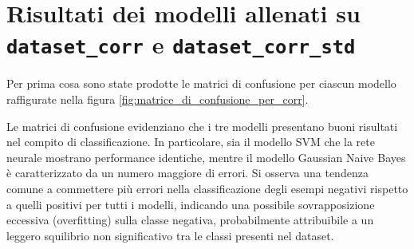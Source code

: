 \section{Risultati dei modelli allenati su \texttt{dataset\_corr} e
  \texttt{dataset\_corr\_std}} \label{sec:risultati_corr}
Per prima cosa sono state prodotte le matrici di confusione per ciascun modello
raffigurate nella figura \ref{fig:matrice_di_confusione_per_corr}.

Le matrici di confusione evidenziano che i tre modelli presentano buoni risultati
nel compito di classificazione. In particolare, sia il modello SVM che la rete
neurale mostrano performance identiche, mentre il modello Gaussian Naive Bayes è
caratterizzato da un numero maggiore di errori. Si osserva una tendenza comune a
commettere più errori nella classificazione degli esempi negativi rispetto a
quelli positivi per tutti i modelli, indicando una possibile sovrapposizione
eccessiva (overfitting) sulla classe negativa, probabilmente attribuibile a un
leggero squilibrio non significativo tra le classi presenti nel dataset.

